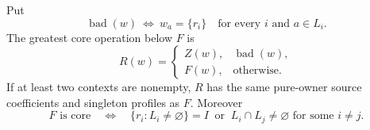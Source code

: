 \begin{theorem}\label{core:thm:head-circuits}
Put
\[
 \operatorname{bad}(w)\ \Longleftrightarrow\
 w_a=\{r_i\}\quad\text{for every }i\text{ and }a\in L_i.
\]
The greatest core operation below $F$ is
\begin{equation}\label{core:eq:head-minorant}
 R(w)=\begin{cases}Z(w),&\operatorname{bad}(w),\\
                    F(w),&\text{otherwise}.
       \end{cases}
\end{equation}
If at least two contexts are nonempty, $R$ has the same pure-owner source
coefficients and singleton profiles as $F$. Moreover
\begin{equation}\label{core:eq:head-classification}
 F\text{ is core}\quad\Longleftrightarrow\quad
 \{r_i:L_i\ne\varnothing\}=I\ \text{ or }\
 L_i\cap L_j\ne\varnothing\text{ for some }i\ne j.
\end{equation}
\end{theorem}

